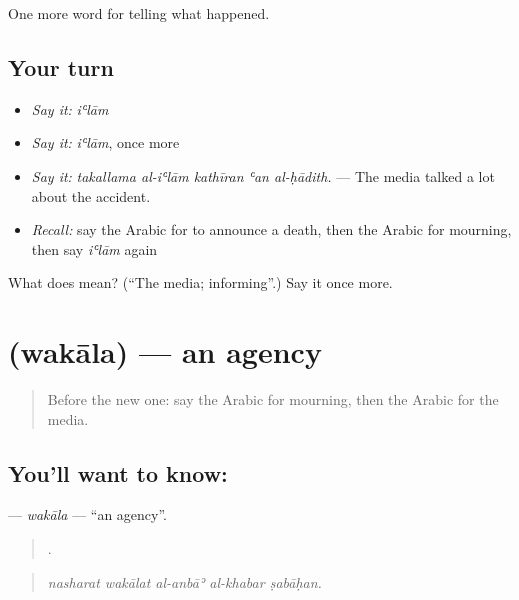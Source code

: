 \begin{grammarlens}[title={What you've built}]
One more word for telling what happened.
\end{grammarlens}

\subsection*{Your turn}
\begin{itemize}
\raggedright
  \item \emph{Say it:} \emph{iʿlām}
  \item \emph{Say it:} \emph{iʿlām}, once more
  \item \emph{Say it:} \emph{takallama al-iʿlām kathīran ʿan al-ḥādith.} — The media talked a lot about the accident.
  \item \emph{Recall:} say the Arabic for to announce a death, then the Arabic for mourning, then say \emph{iʿlām} again
\end{itemize}

\begin{tcolorbox}[breakable,colback=teal!4,colframe=teal!35!black,title={Before you move on}]
What does  mean? (\textquotedblleft{}The media; informing\textquotedblright{}.) Say it once more.
\end{tcolorbox}
\section[\texorpdfstring{\ar{وكالة} (wakāla)}{وكالة (wakāla)}]{ (wakāla) — an agency}

\label{lesson:AR-C320-wakala}



\begin{quote}
Before the new one: say the Arabic for mourning, then the Arabic for the media.
\end{quote}

\subsection*{You'll want to know: }
\textbf{} — \emph{wakāla} — \textquotedblleft{}an agency\textquotedblright{}.

\begin{quote}
    .
\end{quote}

\begin{quote}
\emph{nasharat wakālat al-anbāʾ al-khabar ṣabāḥan.}
\end{quote}

